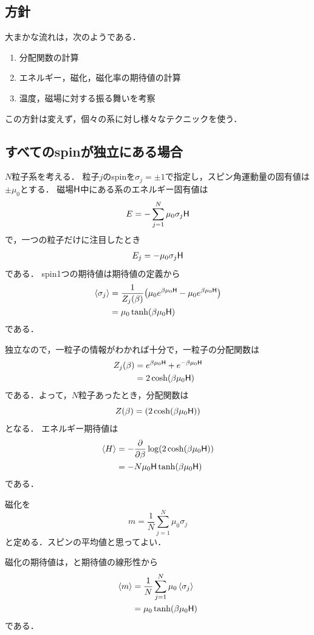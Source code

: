 	\subsection{方針}
	大まかな流れは，次のようである．
	\begin{enumerate}
			\item 分配関数の計算
			\item エネルギー，磁化，磁化率の期待値の計算
			\item 温度，磁場に対する振る舞いを考察
	\end{enumerate}
	この方針は変えず，個々の系に対し様々なテクニックを使う．

	\subsection{すべてのspinが独立にある場合}
	$N$粒子系を考える．
	粒子$j$のspinを$\sigma_j = \pm 1$で指定し，スピン角運動量の固有値は$\pm\mu_0$とする．
	磁場$\mathsf{H}$中にある系のエネルギー固有値は
	\begin{equation}
			E = -\sum_{j=1}^{N}\mu_0\sigma_j\mathsf{H}
	\end{equation}
	で，一つの粒子だけに注目したとき
	\begin{align}
			E_j = -\mu_0\sigma_j\mathsf{H}
	\end{align}
	である．
	spin1つの期待値は期待値の定義から
	\begin{align}
			\expval{\sigma_j} &= \frac{1}{Z_j(\beta)}\qty(\mu_0e^{\beta\mu_0\mathsf{H}} - \mu_0e^{\beta\mu_0\mathsf{H}})\\
							  &= \mu_0\tanh(\beta\mu_0\mathsf{H})\label{eq:onespin}
	\end{align}
	である．

	独立なので，一粒子の情報がわかれば十分で，一粒子の分配関数は
	\begin{align}
			Z_j(\beta) &= e^{\beta\mu_0\mathsf{H}} + e^{-\beta\mu_0\mathsf{H}}\\
				&= 2\cosh(\beta\mu_0\mathsf{H})
	\end{align}
	である．よって，$N$粒子あったとき，分配関数は
	\begin{equation}
			Z(\beta) = \qty(2\cosh(\beta\mu_0\mathsf{H}))
	\end{equation}
	となる．
	エネルギー期待値は
	\begin{align}
			\langle H\rangle &= -\pdv{}{\beta}\log(2\cosh(\beta\mu_0\mathsf{H}))\\
							 &= -N\mu_0\mathsf{H}\tanh(\beta\mu_0\mathsf{H})
	\end{align}
	である．

	\begin{defn}[磁化]
			磁化を
			\begin{equation}
					m = \frac{1}{N}\sum_{j = 1}^{N}\mu_0\sigma_j
			\end{equation}
			と定める．スピンの平均値と思ってよい．
	\end{defn}
	磁化の期待値は，と期待値の線形性から
	\begin{align}
			\expval{m} &= \frac{1}{N}\sum_{j = 1}^{N}\mu_0\expval{\sigma_j}\\
					   &= \mu_0\tanh(\beta\mu_0\mathsf{H})
	\end{align}
	である．


